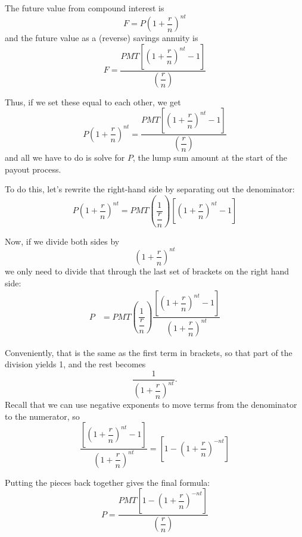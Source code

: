 The future value from compound interest is \[F = P\left(1 + \dfrac{r}{n}\right)^{nt}\]
and the future value as a (reverse) savings annuity is \[F=\dfrac{PMT\left[\left(1+\dfrac{r}{n}\right)^{nt}-1\right]}{\left(\dfrac{r}{n}\right)}\]

Thus, if we set these equal to each other, we get
\[P\left(1 + \dfrac{r}{n}\right)^{nt}=\dfrac{PMT\left[\left(1+\dfrac{r}{n}\right)^{nt}-1\right]}{\left(\dfrac{r}{n}\right)}\]
and all we have to do is solve for $P$, the lump sum amount at the start of the payout process.

To do this, let's rewrite the right-hand side by separating out the denominator:
\[P\left(1 + \dfrac{r}{n}\right)^{nt}=PMT\left(\dfrac{1}{\dfrac{r}{n}}\right)\left[\left(1+\dfrac{r}{n}\right)^{nt}-1\right]\]

Now, if we divide both sides by \[\left(1 + \dfrac{r}{n}\right)^{nt}\] we only need to divide that through the last set of brackets on the right hand side:
\begin{align*}
P &= PMT\left(\dfrac{1}{\dfrac{r}{n}}\right)\dfrac{\left[\left(1+\dfrac{r}{n}\right)^{nt}-1\right]}{\left(1 + \dfrac{r}{n}\right)^{nt}}
\end{align*}

Conveniently, that is the same as the first term in brackets, so that part of the division yields 1, and the rest becomes \[\dfrac{1}{\left(1 + \dfrac{r}{n}\right)^{nt}}.\]
Recall that we can use negative exponents to move terms from the denominator to the numerator, so
\[\dfrac{\left[\left(1+\dfrac{r}{n}\right)^{nt}-1\right]}{\left(1 + \dfrac{r}{n}\right)^{nt}} = \left[1-\left(1 + \dfrac{r}{n}\right)^{-nt}\right]\]

Putting the pieces back together gives the final formula:
\[\boxed{P = \dfrac{PMT\left[1-\left(1+\dfrac{r}{n}\right)^{-nt}\right]}{\left(\dfrac{r}{n}\right)}}\]
